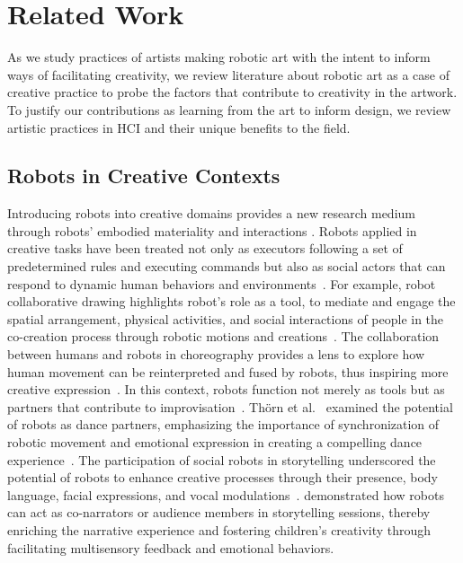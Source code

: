 \section{Related Work}
As we study practices of artists making robotic art with the intent to inform ways of facilitating creativity, we review literature about robotic art as a case of creative practice to probe the factors that contribute to creativity in the artwork. To justify our contributions as learning from the art to inform design, we review artistic practices in HCI and their unique benefits to the field.

\subsection{Robots in Creative Contexts}

Introducing robots into creative domains provides a new research medium through robots' embodied materiality and interactions \cite{Nitsche2019craft}. Robots applied in creative tasks have been treated not only as executors following a set of predetermined rules and executing commands but also as social actors that can respond to dynamic human behaviors and environments~\cite{nam2023dreams}. For example, robot collaborative drawing highlights robot's role as a tool, to mediate and engage the spatial arrangement, physical activities, and social interactions of people in the co-creation process through robotic motions and creations~\cite{hoggenmueller2020woodie}.  The collaboration between humans and robots in choreography provides a lens to explore how human movement can be reinterpreted and fused by robots, thus inspiring more creative expression~\cite{saviano2024cage, hsueh2019understanding}. In this context, robots function not merely as tools but as partners that contribute to improvisation~\cite{rogel2022music}. Th{\"o}rn et al.~\cite{thorn2020human} examined the potential of robots as dance partners, emphasizing the importance of synchronization of robotic movement and emotional expression in creating a compelling dance experience~\cite{nam2014interactive}. The participation of social robots in storytelling underscored the potential of robots to enhance creative processes through their presence, body language, facial expressions, and vocal modulations~\cite{jeon2017robotic}. \citet{antunes2022inclusive} demonstrated how robots can act as co-narrators or audience members in storytelling sessions, thereby enriching the narrative experience and fostering children's creativity through facilitating multisensory feedback and emotional behaviors.

